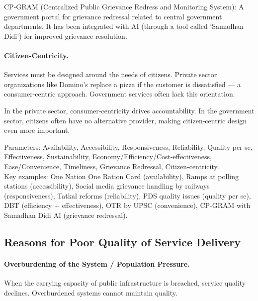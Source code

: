 \begin{GovtPolicy}
CP-GRAM (Centralized Public Grievance Redress and Monitoring System): A government portal for grievance redressal related to central government departments. It has been integrated with AI (through a tool called `Samadhan Didi') for improved grievance resolution.
\end{GovtPolicy}

\paragraph{Citizen-Centricity.} Services must be designed around the needs of citizens. Private sector organizations like Domino's replace a pizza if the customer is dissatisfied --- a consumer-centric approach. Government services often lack this orientation.

\begin{CriticalPoint}
In the private sector, consumer-centricity drives accountability. In the government sector, citizens often have no alternative provider, making citizen-centric design even more important.
\end{CriticalPoint}

\begin{QuickRevision}
Parameters: Availability, Accessibility, Responsiveness, Reliability, Quality per se, Effectiveness, Sustainability, Economy/Efficiency/Cost-effectiveness, Ease/Convenience, Timeliness, Grievance Redressal, Citizen-centricity.\\
Key examples: One Nation One Ration Card (availability), Ramps at polling stations (accessibility), Social media grievance handling by railways (responsiveness), Tatkal reforms (reliability), PDS quality issues (quality per se), DBT (efficiency + effectiveness), OTR by UPSC (convenience), CP-GRAM with Samadhan Didi AI (grievance redressal).
\end{QuickRevision}

\subsection{Reasons for Poor Quality of Service Delivery}

\paragraph{Overburdening of the System / Population Pressure.} When the carrying capacity of public infrastructure is breached, service quality declines. Overburdened systems cannot maintain quality.

